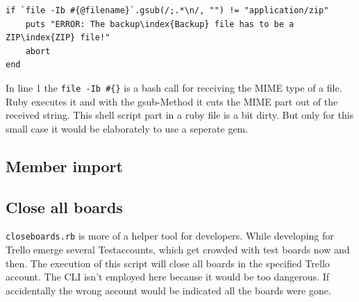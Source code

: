 \begin{lstlisting}[aboveskip=1\baselineskip, caption=Checking if the file has the MIME type \textquotedblleft application/zip\textquotedblright, label=listing008]
if `file -Ib #{@filename}`.gsub(/;.*\n/, "") != "application/zip"
	puts "ERROR: The backup\index{Backup} file has to be a ZIP\index{ZIP} file!"
	abort
end
\end{lstlisting}

	
In line 1 the \texttt{file -Ib \#\{\@filename\}} is a bash call for receiving the MIME type of a file. Ruby executes it and with the gsub-Method it cuts the MIME part out of the received string. This shell script part in a ruby file is a bit dirty. But only for this small case it would be elaborately to use a seperate gem.




\subsection{Member import}


\subsection{Close all boards}
\texttt{closeboards.rb} is more of a helper tool for developers. While developing for Trello emerge several Testaccounts, which get crowded with test boards now and then. The execution of this script will close all boards in the specified Trello account. The CLI isn't employed here because it would be too dangerous. If accidentally the wrong account would be indicated all the boards were gone.

